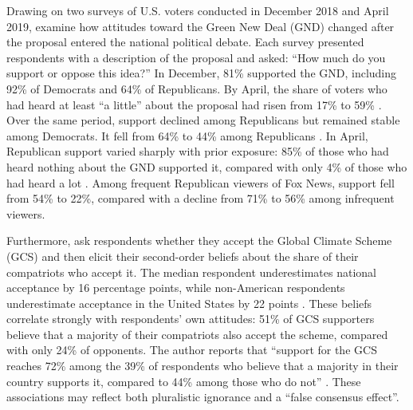 Drawing on two surveys of U.S. voters conducted in December 2018 and April 2019, \citet{gustafson_development_2019} examine how attitudes toward the Green New Deal (GND) changed after the proposal entered the national political debate. Each survey presented respondents with a description of the proposal and asked: ``How much do you support or oppose this idea?'' In December, 81\% supported the GND, including 92\% of Democrats and 64\% of Republicans. By April, the share of voters who had heard at least ``a little'' about the proposal had risen from 17\% to 59\% \citep[Figure 1]{gustafson_development_2019}. Over the same period, support declined among Republicans but remained stable among Democrats. It fell from 64\% to 44\% among Republicans \citep[Figure 2]{gustafson_development_2019}. 
In April, Republican support varied sharply with prior exposure: 85\% of those who had heard nothing about the GND supported it, compared with only 4\% of those who had heard a lot \citep[Figure 3]{gustafson_development_2019}. Among frequent Republican viewers of Fox News, support fell from 54\% to 22\%, compared with a decline from 71\% to 56\% among infrequent viewers. 


Furthermore, \citet{fabre_public_2026} ask respondents whether they accept the Global Climate Scheme (GCS) and then elicit their second-order beliefs about the share of their compatriots who accept it. The median respondent underestimates national acceptance by 16 percentage points, while non-American respondents underestimate acceptance in the United States by 22 points \citep[Figure S30]{fabre_public_2026}. These beliefs correlate strongly with respondents' own attitudes: 51\% of GCS supporters believe that a majority of their compatriots also accept the scheme, compared with only 24\% of opponents. The author reports that ``support for the GCS reaches 72\% among the 39\% of respondents who believe that a majority in their country supports it, compared to 44\% among those who do not'' \citep[Figure S30]{fabre_public_2026}. These associations may reflect both pluralistic ignorance and a ``false consensus effect''.


